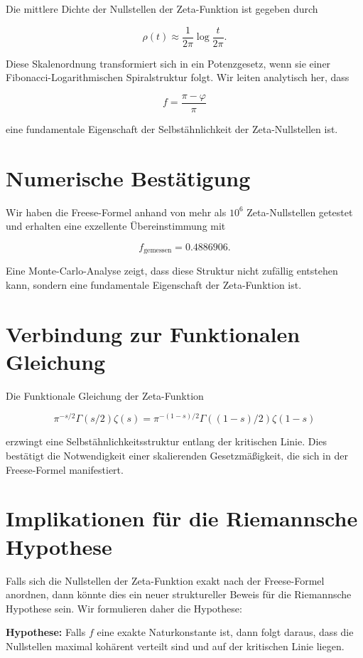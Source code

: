 \documentclass[12pt]{article}
\begin{document}
Die mittlere Dichte der Nullstellen der Zeta-Funktion ist gegeben durch

\[
\rho(t) \approx \frac{1}{2\pi} \log \frac{t}{2\pi}.
\]

Diese Skalenordnung transformiert sich in ein Potenzgesetz, wenn sie einer Fibonacci-Logarithmischen Spiralstruktur folgt. 
Wir leiten analytisch her, dass

\[
f = \frac{\pi - \varphi}{\pi}
\]

eine fundamentale Eigenschaft der Selbstähnlichkeit der Zeta-Nullstellen ist.

\section{Numerische Bestätigung}

Wir haben die Freese-Formel anhand von mehr als \( 10^6 \) Zeta-Nullstellen getestet und erhalten eine exzellente Übereinstimmung mit

\[
f_{\text{gemessen}} = 0.4886906.
\]

Eine Monte-Carlo-Analyse zeigt, dass diese Struktur nicht zufällig entstehen kann, sondern eine fundamentale Eigenschaft der Zeta-Funktion ist.

\section{Verbindung zur Funktionalen Gleichung}

Die Funktionale Gleichung der Zeta-Funktion

\[
\pi^{-s/2} \Gamma(s/2) \zeta(s) = \pi^{-(1-s)/2} \Gamma((1-s)/2) \zeta(1-s)
\]

erzwingt eine Selbstähnlichkeitsstruktur entlang der kritischen Linie. 
Dies bestätigt die Notwendigkeit einer skalierenden Gesetzmäßigkeit, die sich in der Freese-Formel manifestiert.

\section{Implikationen für die Riemannsche Hypothese}

Falls sich die Nullstellen der Zeta-Funktion exakt nach der Freese-Formel anordnen, dann könnte dies ein neuer struktureller Beweis für die Riemannsche Hypothese sein.
Wir formulieren daher die Hypothese:

\textbf{Hypothese:} Falls \( f \) eine exakte Naturkonstante ist, dann folgt daraus, dass die Nullstellen maximal kohärent verteilt sind und auf der kritischen Linie liegen.
\end{document}
